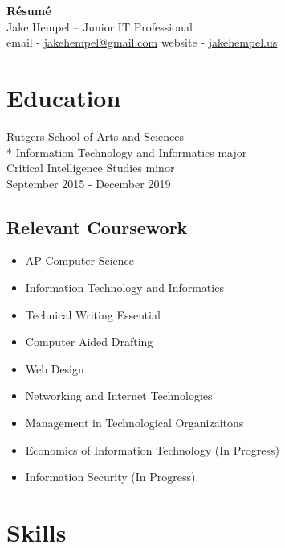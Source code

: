 \documentclass{article}
\begin{document}
\begin{center}
\Huge{\textbf{R\'esum\'e}} \\
\Large{Jake Hempel -- Junior IT Professional}\\
email - \href{mailto:jakehempel@gmail.com}{jakehempel@gmail.com}
website - \href{jakehempel.us}{jakehempel.us}
\end{center}

\begin{multicols}{2}

\section{Education}
Rutgers School of Arts and Sciences\\*
Information Technology and Informatics major\\
Critical Intelligence Studies minor\\
September 2015 - December 2019

\subsection{Relevant Coursework}
\begin{itemize}
\item AP Computer Science
\item Information Technology and Informatics
\item Technical Writing Essential
\item Computer Aided Drafting
\item Web Design
\item Networking and Internet Technologies
\item Management in Technological Organizaitons
\item Economics of Information Technology (In Progress)
\item Information Security (In Progress)
\end{itemize}


\section{Skills}

\iffalse
\subsection{Soft Skills}
Technical Writing/Documentation Writing, Router Configuration, Server Administration, Raspberry Pi, Arduino
\fi


\end{multicols}
\end{document}
